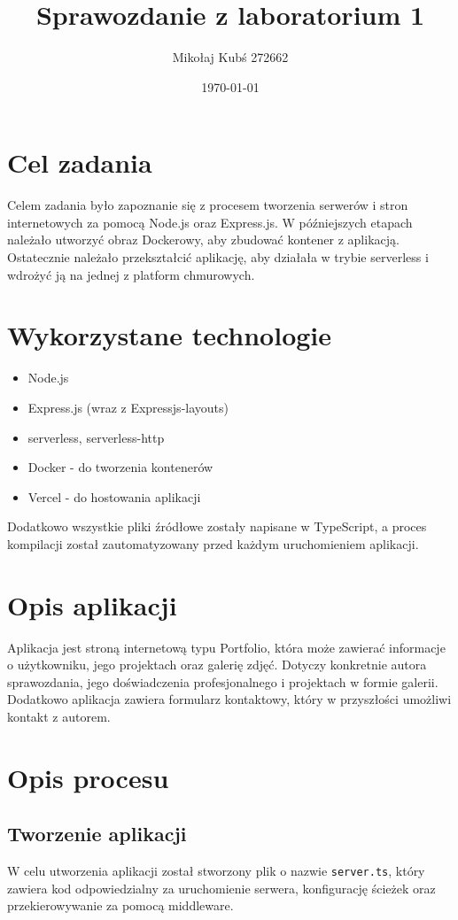 \documentclass[a4paper,12pt]{article}
\title{Sprawozdanie z laboratorium 1}
\author{Mikołaj Kubś 272662}
\date{\today}
\begin{document}
\maketitle

\section{Cel zadania}
Celem zadania było zapoznanie się z procesem tworzenia serwerów i stron internetowych za pomocą Node.js oraz Express.js. W późniejszych etapach należało utworzyć obraz Dockerowy, aby zbudować kontener z aplikacją. Ostatecznie należało przekształcić aplikację, aby działała w trybie serverless i wdrożyć ją na jednej z platform chmurowych.

\section{Wykorzystane technologie}
\begin{itemize}
    \item Node.js
    \item Express.js (wraz z Expressjs-layouts)
    \item serverless, serverless-http
    \item Docker - do tworzenia kontenerów
    \item Vercel - do hostowania aplikacji
\end{itemize}

Dodatkowo wszystkie pliki źródłowe zostały napisane w TypeScript, a proces kompilacji został zautomatyzowany przed każdym uruchomieniem aplikacji.

\section{Opis aplikacji}
Aplikacja jest stroną internetową typu Portfolio, która może zawierać informacje o użytkowniku, jego projektach oraz galerię zdjęć. Dotyczy konkretnie autora sprawozdania, jego doświadczenia profesjonalnego i projektach w formie galerii. Dodatkowo aplikacja zawiera formularz kontaktowy, który w przyszłości umożliwi kontakt z autorem.

\section{Opis procesu}
\subsection{Tworzenie aplikacji}
W celu utworzenia aplikacji został stworzony plik o nazwie \texttt{server.ts}, który zawiera kod odpowiedzialny za uruchomienie serwera, konfigurację ścieżek oraz przekierowywanie za pomocą middleware.
\end{document}
